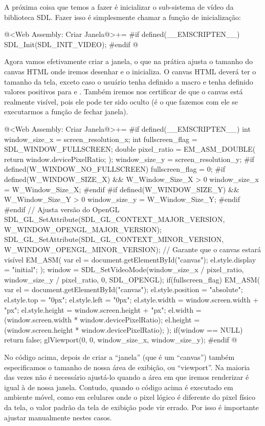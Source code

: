 A próxima coisa que temos a fazer é inicializar o sub-sistema de vídeo
da biblioteca SDL. Fazer isso é simplesmente chamar a função de
inicialização:

\iniciocodigo
@<Web Assembly: Criar Janela@>+=
#if defined(__EMSCRIPTEN__)
SDL_Init(SDL_INIT_VIDEO);
#endif
@
\fimcodigo

Agora vamos efetivamente criar a janela, o que na prática ajusta o
tamanho do canvas HTML onde iremos desenhar e o inicializa. O canvas
HTML deverá ter o tamanho da tela, exceto caso o usuário tenha
definido a macro  e tenha
definido valores positivos para 
e . Também iremos nos certificar
de que o canvas está realmente visível, pois ele pode ter sido oculto
(é o que fazemos com ele se executarmos a função de fechar janela).

\iniciocodigo
@<Web Assembly: Criar Janela@>+=
#if defined(__EMSCRIPTEN__)
{
  int window_size_x = screen_resolution_x;
  int fullscreen_flag = SDL_WINDOW_FULLSCREEN;
  double pixel_ratio = EM_ASM_DOUBLE({
    return window.devicePixelRatio;
  });
  window_size_y = screen_resolution_y;
#if defined(W_WINDOW_NO_FULLSCREEN)
  fullscreen_flag = 0;
#if defined(W_WINDOW_SIZE_X) && W_Window_Size_X > 0
  window_size_x = W_Window_Size_X;
#endif
#if defined(W_WINDOW_SIZE_Y) && W_Window_Size_Y > 0
  window_size_y = W_Window_Size_Y;
#endif
#endif
  // Ajusta versão do OpenGL
  SDL_GL_SetAttribute(SDL_GL_CONTEXT_MAJOR_VERSION,
                     W_WINDOW_OPENGL_MAJOR_VERSION);
  SDL_GL_SetAttribute(SDL_GL_CONTEXT_MINOR_VERSION,
                     W_WINDOW_OPENGL_MINOR_VERSION);
  // Garante que o canvas estará visível
  EM_ASM(
    var el = document.getElementById("canvas");
    el.style.display = "initial";
  );
  window = SDL_SetVideoMode(window_size_x / pixel_ratio,
                            window_size_y / pixel_ratio, 0, SDL_OPENGL);
  if(fullscreen_flag){
    EM_ASM(
      var el = document.getElementById("canvas");
      el.style.position = "absolute";
      el.style.top = "0px";
      el.style.left = "0px";
      el.style.width = window.screen.width + "px";
      el.style.height = window.screen.height + "px";
      el.width = (window.screen.width * window.devicePixelRatio);
      el.height = (window.screen.height * window.devicePixelRatio);
    );
  }
  if(window == NULL)
    return false;
  glViewport(0, 0, window_size_x, window_size_y);
}
#endif
@
\fimcodigo

No código acima, depois de criar a ``janela'' (que é um ``canvas'') também
especificamos o tamanho de nossa área de exibição, ou ``viewport''. Na
maioria das vezes não é necessário ajustá-lo quando a área em que
iremos renderizar é igual à de nossa janela. Contudo, quando o código
acima é executado em ambiente móvel, como em celulares onde o pixel
lógico é diferente do pixel físico da tela, o valor padrão da tela de
exibição pode vir errado. Por isso é importante ajustar manualmente
nestes casos.

